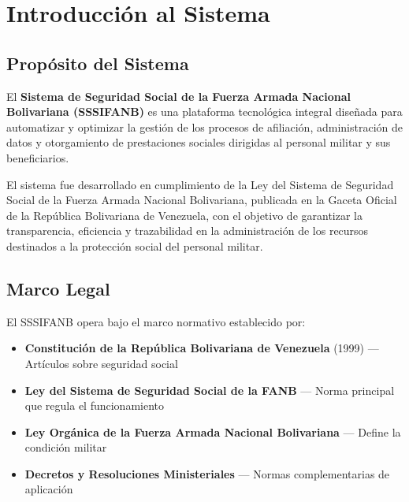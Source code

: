 
\chapter{Introducción al Sistema}
\label{ch:introduccion}

\section{Propósito del Sistema}

El \textbf{Sistema de Seguridad Social de la Fuerza Armada Nacional Bolivariana (SSSIFANB)} es una plataforma tecnológica integral diseñada para automatizar y optimizar la gestión de los procesos de afiliación, administración de datos y otorgamiento de prestaciones sociales dirigidas al personal militar y sus beneficiarios.

El sistema fue desarrollado en cumplimiento de la Ley del Sistema de Seguridad Social de la Fuerza Armada Nacional Bolivariana, publicada en la Gaceta Oficial de la República Bolivariana de Venezuela, con el objetivo de garantizar la transparencia, eficiencia y trazabilidad en la administración de los recursos destinados a la protección social del personal militar.

\section{Marco Legal}

El SSSIFANB opera bajo el marco normativo establecido por:

\begin{itemize}[leftmargin=*]
    \item \textbf{Constitución de la República Bolivariana de Venezuela} (1999) — Artículos sobre seguridad social
    \item \textbf{Ley del Sistema de Seguridad Social de la FANB} — Norma principal que regula el funcionamiento
    \item \textbf{Ley Orgánica de la Fuerza Armada Nacional Bolivariana} — Define la condición militar
    \item \textbf{Decretos y Resoluciones Ministeriales} — Normas complementarias de aplicación
\end{itemize}

